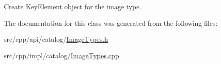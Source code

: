 Create KeyElement object for the image type. 

The documentation for this class was generated from the following files:\begin{DoxyCompactItemize}
\item 
src/cpp/api/catalog/\hyperlink{ImageTypes_8h}{ImageTypes.h}\item 
src/cpp/impl/catalog/\hyperlink{ImageTypes_8cpp}{ImageTypes.cpp}\end{DoxyCompactItemize}
